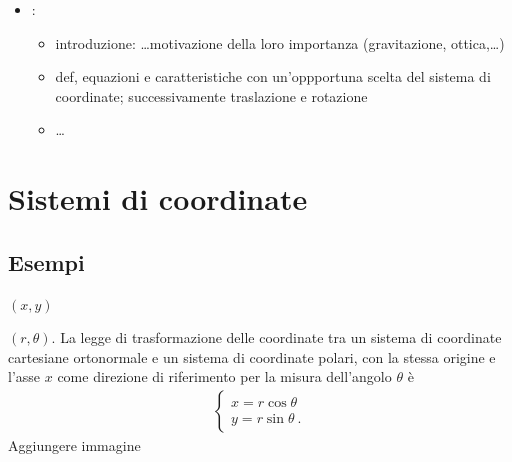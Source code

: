 \documentclass[letterpaper,10pt,italian]{jupyterBook}
\begin{document}
\begin{itemize}
\begin{itemize}
\begin{itemize}
\item {} 
\sphinxAtStartPar
posizione relativa punto\sphinxhyphen{}retta, distanza punto\sphinxhyphen{}retta, posizione relativa retta\sphinxhyphen{}retta

\end{itemize}

\item {} 
\sphinxAtStartPar
{}:
\begin{itemize}
\item {} 
\sphinxAtStartPar
introduzione: …motivazione della loro importanza (gravitazione, ottica,…)

\item {} 
\sphinxAtStartPar
def, equazioni e caratteristiche con un’oppportuna scelta del sistema di coordinate; successivamente traslazione e rotazione

\item {} 
\sphinxAtStartPar
…

\end{itemize}

\end{itemize}

\end{itemize}

\sphinxstepscope


\section{Sistemi di coordinate}
\label{\detokenize{ch/analytic_geometry/analytic_geometry_2d/coordinates:sistemi-di-coordinate}}\label{\detokenize{ch/analytic_geometry/analytic_geometry_2d/coordinates:geometry-analytic-2d-coordinates}}\label{\detokenize{ch/analytic_geometry/analytic_geometry_2d/coordinates::doc}}

\subsection{Esempi}
\label{\detokenize{ch/analytic_geometry/analytic_geometry_2d/coordinates:esempi}}
\sphinxAtStartPar
{} \((x, y)\)

\sphinxAtStartPar
{} \((r, \theta)\). La legge di trasformazione delle coordinate tra un sistema di coordinate cartesiane ortonormale e un sistema di coordinate polari, con la stessa origine e l’asse \(x\) come direzione di riferimento per la misura dell’angolo \(\theta\) è
\begin{equation*}
\begin{split}\begin{cases}
  x = r \cos \theta \\
  y = r \sin \theta \ .
\end{cases}\end{split}
\end{equation*}
\sphinxAtStartPar
{} Aggiungere immagine
\end{document}
